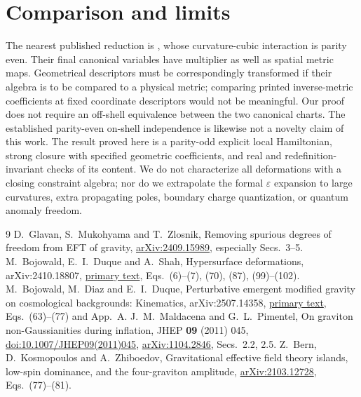 \documentclass[11pt]{article}
\newcommand{\ep}{\varepsilon}
\begin{document}
\section{Comparison and limits}
The nearest published reduction is \cite[Secs.~3--5]{GMZ}, whose curvature-cubic interaction is parity even. Their final canonical variables have multiplier as well as spatial metric maps. Geometrical descriptors must be correspondingly transformed if their algebra is to be compared to a physical metric; comparing printed inverse-metric coefficients at fixed coordinate descriptors would not be meaningful. Our proof does not require an off-shell equivalence between the two canonical charts. The established parity-even on-shell independence \cite{BKZ} is likewise not a novelty claim of this work. The result proved here is a parity-odd explicit local Hamiltonian, strong closure with specified geometric coefficients, and real and redefinition-invariant checks of its content. We do not characterize all deformations with a closing constraint algebra; nor do we extrapolate the formal \(\ep\) expansion to large curvatures, extra propagating poles, boundary charge quantization, or quantum anomaly freedom.

\begin{thebibliography}{9}
D.~Glavan, S.~Mukohyama and T.~Zlosnik,
\newblock Removing spurious degrees of freedom from EFT of gravity,
\newblock \href{https://arxiv.org/abs/2409.15989}{arXiv:2409.15989}, especially Secs.~3--5.
M.~Bojowald, E.~I.~Duque and A.~Shah,
\newblock Hypersurface deformations, arXiv:2410.18807,
\newblock \href{https://arxiv.org/html/2410.18807v1}{primary text}, Eqs.~(6)--(7), (70), (87), (99)--(102).
M.~Bojowald, M.~Diaz and E.~I.~Duque,
\newblock Perturbative emergent modified gravity on cosmological backgrounds: Kinematics, arXiv:2507.14358,
\newblock \href{https://arxiv.org/html/2507.14358}{primary text}, Eqs.~(63)--(77) and App.~A.
J.~M.~Maldacena and G.~L.~Pimentel,
\newblock On graviton non-Gaussianities during inflation,
\newblock JHEP \textbf{09} (2011) 045,
\newblock \href{https://doi.org/10.1007/JHEP09(2011)045}{doi:10.1007/JHEP09(2011)045},
\newblock \href{https://arxiv.org/abs/1104.2846}{arXiv:1104.2846}, Secs.~2.2, 2.5.
Z.~Bern, D.~Kosmopoulos and A.~Zhiboedov,
\newblock Gravitational effective field theory islands, low-spin dominance, and the four-graviton amplitude,
\newblock \href{https://arxiv.org/abs/2103.12728}{arXiv:2103.12728}, Eqs.~(77)--(81).
\end{thebibliography}
\end{document}
